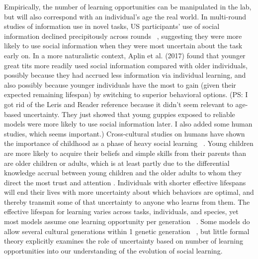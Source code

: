 \documentclass[letterpaper,11.5pt]{scrartcl}
\newcommand{\mt}[1]{{\textcolor{myorange} {({\tiny MT:} #1)}}}
\newcommand{\ps}[1]{{\textcolor{mygreen} {({\tiny PS:} #1)}}}
\begin{document}
Empirically, the number of learning opportunities can be manipulated in the lab, but will also correspond with an individual's age the real world. In multi-round studies of information use in novel tasks, US participants' use of social information declined precipitously across rounds ~\cite{McElreath2005}, suggesting they were more likely to use social information when they were most uncertain about the task early on. In a more naturalistic context, Aplin et al. (2017) \nocite{Aplin2017} found that younger great tits more readily used social information compared with older individuals, possibly because they had accrued less information via individual learning, and also possibly because younger individuals have the most to gain (given their expected remaining lifespan) by switching to superior behavioral options. \ps{I got rid of the Leris and Reader reference because it didn't seem relevant to age-based uncertainty. They just showed that young guppies exposed to reliable models were more likely to use social information later. I also added some human studies, which seems important.} Cross-cultural studies on humans have shown the importance of childhood as a phase of heavy social learning ~\cite{Reyes2016}. Young children are more likely to acquire their beliefs and simple skills from their parents than are older children or adults, which is at least partly due to the differential knowledge accrual between young children and the older adults to whom they direct the most trust and attention \cite{kline2013teaching}.
Individuals with shorter effective lifespans will end their lives with more uncertainty about which behaviors are optimal, and thereby transmit some of that uncertainty to anyone who learns from them. The effective lifespan for learning varies across tasks, individuals, and species, yet most models assume one learning opportunity per generation ~\cite{Feldman1996,Henrich1998, perreault2012bayesian}. Some models do allow several cultural generations within 1 genetic generation ~\cite{Enquist2007}, but little formal theory explicitly examines the role of uncertainty based on number of learning opportunities into our understanding of the evolution of social learning. 

\end{document}

